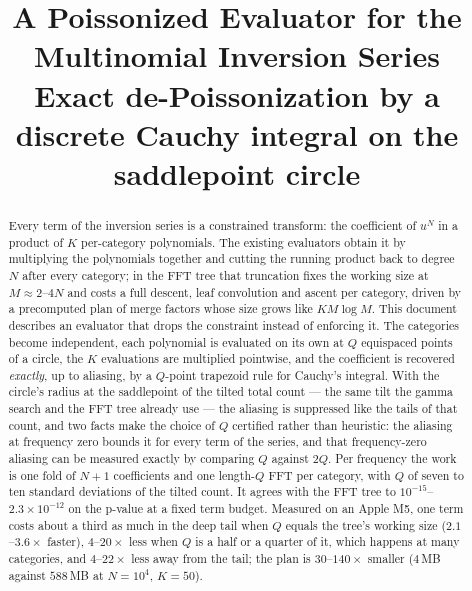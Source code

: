 \documentclass[11pt]{article}
\title{A Poissonized Evaluator for the Multinomial Inversion Series\\
\large Exact de-Poissonization by a discrete Cauchy integral on the saddlepoint circle}
\author{}
\date{}
\begin{document}
\maketitle

\begin{abstract}
Every term of the inversion series is a constrained transform: the coefficient of $u^N$ in a
product of $K$ per-category polynomials. The existing evaluators obtain it by multiplying the
polynomials together and cutting the running product back to degree $N$ after every category; in
the FFT tree that truncation fixes the working size at $M\approx2$--$4N$ and costs a full descent,
leaf convolution and ascent per category, driven by a precomputed plan of merge factors whose size
grows like $KM\log M$. This document describes an evaluator that drops the constraint instead of
enforcing it. The categories become independent, each polynomial is evaluated on its own at $Q$
equispaced points of a circle, the $K$ evaluations are multiplied pointwise, and the coefficient is
recovered \emph{exactly}, up to aliasing, by a $Q$-point trapezoid rule for Cauchy's integral. With
the circle's radius at the saddlepoint of the tilted total count --- the same tilt the gamma search
and the FFT tree already use --- the aliasing is suppressed like the tails of that count, and two
facts make the choice of $Q$ certified rather than heuristic: the aliasing at frequency zero bounds
it for every term of the series, and that frequency-zero aliasing can be measured exactly by
comparing $Q$ against $2Q$. Per frequency the work is one fold of $N+1$ coefficients and one
length-$Q$ FFT per category, with $Q$ of seven to ten standard deviations of the tilted count. It
agrees with the FFT tree to $10^{-15}$--$2.3\times10^{-12}$ on the p-value at a fixed term budget.
Measured on an Apple M5, one term costs about a third as much in the deep tail when $Q$ equals the
tree's working size ($2.1$--$3.6\times$ faster), $4$--$20\times$ less when $Q$ is a half or a
quarter of it, which happens at many categories, and $4$--$22\times$ less away from the tail; the
plan is $30$--$140\times$ smaller ($4$\,MB against $588$\,MB at $N=10^4$, $K=50$).


\end{abstract}
\end{document}
